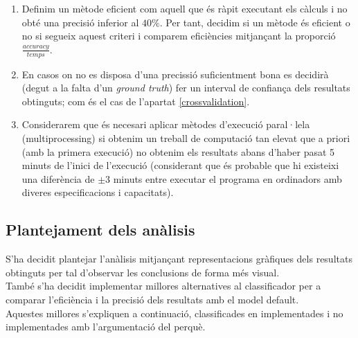 \documentclass[a4paper, 11pt]{article}
\begin{document}
\begin{enumerate}
    \item Definim un mètode eficient com aquell que és ràpit executant els càlculs i no obté una precisió inferior al $40\%$. Per tant, decidim si un mètode és eficient o no si segueix aquest criteri i comparem eficiències mitjançant la proporció $\frac{accuracy}{temps}$.
    \item En casos on no es disposa d'una precissió suficientment bona es decidirà (degut a la falta d'un \textit{ground truth}) fer un interval de confiança dels resultats obtinguts; com és el cas de l'apartat \textcolor{blue}{\ref{crossvalidation}}.
    \item Considerarem que és necesari aplicar mètodes d'execució paral·lela (multiprocessing) si obtenim un treball de computació tan elevat que a priori (amb la primera execució) no obtenim els resultats abans d'haber pasat 5 minuts de l'inici de l'execució (considerant que és probable que hi existeixi una diferència de $\pm3$ minuts entre executar el programa en ordinadors amb diveres especificacions i capacitats).
\end{enumerate}
\newpage

\subsection{Plantejament dels anàlisis}
S'ha decidit plantejar l'anàlisis mitjançant representacions gràfiques dels resultats obtinguts per tal d'observar les conclusions de forma més visual. \\
També s'ha decidit implementar millores alternatives al classificador per a comparar l'eficiència i la precisió dels resultats amb el model default.\\
Aquestes millores s'expliquen a continuació, classificades en implementades i no implementades amb l'argumentació del perquè.
\end{document}
